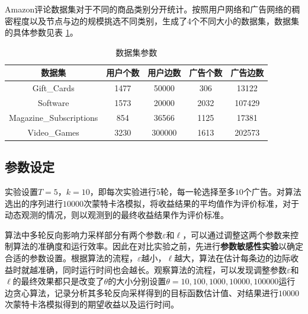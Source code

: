Amazon评论数据集对于不同的商品类别分开统计。按照用户网络和广告网络的稠密程度以及节点与边的规模挑选不同类别，生成了4个不同大小的数据集，数据集的具体参数见表 \ref{tab:imdata}。

\begin{table}[htbp]
	\setlength{\tabcolsep}{2mm}{}
	\centering
	\normalsize
	\caption{数据集参数}\label{tab:imdata}
	\begin{tabular}[t]{|c|c|c|c|c|}
        \hline
		数据集 & 用户个数 & 用户边数 & 广告个数 & 广告边数 \\ \hline
		Gift\_Cards & 1477 & 50000 & 306 & 13122 \\ \hline
		Software & 1573 & 20000 & 2032 & 107429 \\ \hline
		Magazine\_Subscriptions & 854 & 36566 & 1125 & 17381 \\ \hline
		Video\_Games & 3230 & 300000 & 1613 & 202573 \\ \hline
	\end{tabular}	
\end{table}

\subsection{参数设定}

实验设置$T=5$，$k=10$，即每次实验进行$5$轮，每一轮选择至多$10$个广告。对算法选出的序列进行$10000$次蒙特卡洛模拟，将收益结果的平均值作为评价标准，对于动态观测的情况，则以观测到的最终收益结果作为评价标准。

算法中多轮反向影响力采样部分有两个参数$\varepsilon$和$\ell$，可以通过调整这两个参数来控制算法的准确度和运行效率。因此在对比实验之前，先进行\textbf{参数敏感性实验}以确定合适的参数设置。根据算法的流程，$\varepsilon$越小，$\ell$越大，算法在估计每条边的边际收益时就越准确，同时运行时间也会越长。观察算法的流程，可以发现调整参数$\varepsilon$和$\ell$的最终效果都只是改变了$\theta$的大小分别设置$\theta=10,100,1000,10000,100000$运行边贪心算法，记录分析其多轮反向采样得到的目标函数估计值、对结果进行$10000$次蒙特卡洛模拟得到的期望收益以及运行时间。

